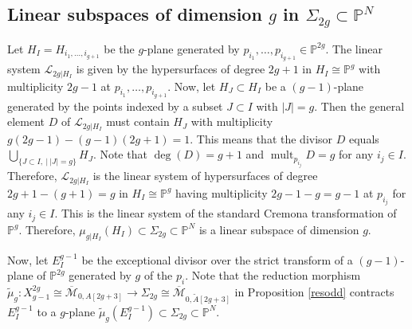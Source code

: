 \documentclass[a4paper,10pt]{amsart}
\theoremstyle{definition}
\newcommand{\cM}{\overline{\mathcal{M}}}
\DeclareMathOperator{\mult}{mult}
\begin{document}
\subsection{Linear subspaces of dimension $g$ in $\Sigma_{2g}\subset\mathbb{P}^N$}\label{linsubsodd} 
Let $H_I = H_{i_1,\dots,i_{g+1}}$ be the $g$-plane generated by $p_{i_1},\dots,p_{i_{g+1}}\in \mathbb{P}^{2g}$. The linear system $\mathcal{L}_{2g|H_I}$ is given by the hypersurfaces of degree $2g+1$ in $H_I\cong \mathbb{P}^g$ with multiplicity $2g-1$ at $p_{i_1},\dots,p_{i_{g+1}}$. Now, let $H_J\subset H_I$ be a $(g-1)$-plane generated by the points indexed by a subset $J\subset I$ with $|J| = g$. Then the general element $D$ of $\mathcal{L}_{2g|H_I}$ must contain $H_J$ with multiplicity $g(2g-1)-(g-1)(2g+1) = 1$. This means that the divisor $D$ equals $\bigcup_{\{J\subset I,\: | \: |J|=g\}}H_J$. Note that $\deg(D) = g+1$ and $\mult_{p_{i_j}}D = g$ for any $i_j\in I$. Therefore, $\mathcal{L}_{2g|H_I}$ is the linear system of hypersurfaces of degree $2g+1-(g+1)=g$ in $H_I\cong\mathbb{P}^g$ having multiplicity $2g-1-g = g-1$ at $p_{i_j}$ for any $i_j\in I$. This is the linear system of the standard Cremona transformation of $\mathbb{P}^g$. Therefore, $\mu_{g|H_I}(H_I)\subset \Sigma_{2g}\subset\mathbb{P}^N$ is a linear subspace of dimension $g$.

Now, let $E_I^{g-1}$ be the exceptional divisor over the strict transform of a $(g-1)$-plane of $\mathbb{P}^{2g}$ generated by $g$ of the $p_i$. Note that the reduction morphism $\widetilde{\mu}_g:X^{2g}_{g-1}\cong \cM_{0,A[2g+3]}\rightarrow \Sigma_{2g}\cong \cM_{0,\widetilde{A}[2g+3]}$ in Proposition \ref{resodd} contracts $E_I^{g-1}$ to a $g$-plane $\widetilde{\mu}_g(E_I^{g-1})\subset \Sigma_{2g}\subset\mathbb{P}^N$.
\end{document}
